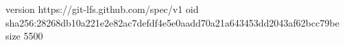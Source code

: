 version https://git-lfs.github.com/spec/v1
oid sha256:28268db10a221e2e82ac7defdf4e5e0aadd70a21a643453dd2043af62bcc79be
size 5500
